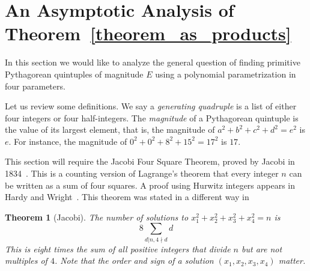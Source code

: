 \documentclass[12pt,table]{article}
\newtheorem{theorem}{Theorem}[section]
\theoremstyle{definition}
\theoremstyle{remark}
\newcommand{\vanish}[1]{}
\numberwithin{equation}{section}
\begin{document}
\vanish{
Moreover, 103 out of 337 quintuples were unable to be 
represented with Hypothesis \ref{as_products}. Still, this is an
 improvement over Hypothesis \ref{as_squares}, which could not
 represent 259 of the quintuples. 
}





\section{An Asymptotic Analysis of Theorem~\ref{theorem_as_products}}



In this section we would like to analyze the general question
of finding primitive Pythagorean quintuples of magnitude $E$ using
a polynomial parametrization in four parameters.



Let us review some definitions. 
We say a  {\em generating quadruple} is a list of
either four integers or four half-integers.
The {\em magnitude} of a Pythagorean 
quintuple is the value of its largest element, that is,
the magnitude of $a^2 + b^2 + c^2 + d^2 = e^2$
is $e$.
For instance, the magnitude of 
$0^2+ 0^2+ 8^2+ 15^2  = 17^2$ is $17$. 


\vanish{
A formula is a function that produces a Pythagorean quintuple when
given a generating quadruple. Recall that the norm of the generating
quadruple equals the magnitude of the Pythagorean quintuple that the
quadruple generates, no matter the formula used. As a result, the
representation found in Theorem \ref{like_Hatcher} does not qualify as
a formula because dividing by the greatest common factor may change
the magnitude.  The intent of this paper was to find a
parameterization for primitive Pythagorean quintuples: to find a list
of formulas whose combined output was every primitive Pythagorean
quintuple.  }



This section will require the Jacobi Four Square Theorem, proved by
Jacobi in 1834~\cite{Jacobi}.  This is a counting
version of Lagrange's theorem that every integer $n$ can
be written as a sum of four squares.
A proof using Hurwitz integers appears in
Hardy and Wright~\cite[Chapter XX, Theorem 386]{Hardy_and_Wright}.
This theorem was
stated in a different way in~\cite{Lalin}
\begin{theorem}[Jacobi]
\label{theorem_representations}
The number of solutions to $x_1^2 +  x_2^2 +  x_3^2 +  x_4^2  = n$ is 
$$
8\sum_{d|n,4\nmid d}{d}
$$
This is eight times the sum of all positive integers that divide $n$ but are not multiples of $4$. Note that 
the order and sign of a solution $(x_1,x_2,x_3,x_4)$ matter. 
\end{theorem}
\end{document}
